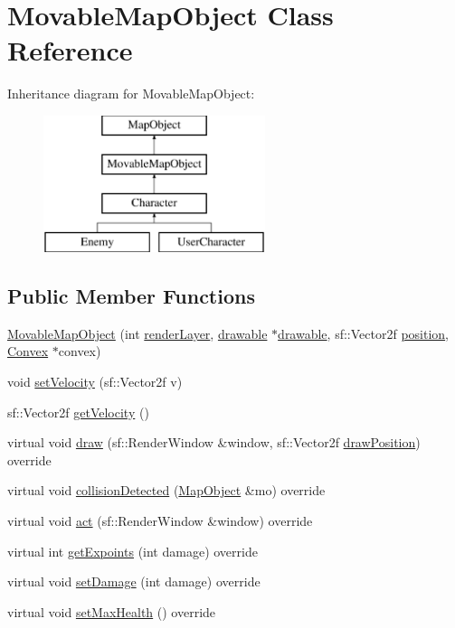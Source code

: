 \hypertarget{class_movable_map_object}{}\section{Movable\+Map\+Object Class Reference}
\label{class_movable_map_object}
Inheritance diagram for Movable\+Map\+Object\+:\begin{figure}[H]
\begin{center}
\leavevmode
\includegraphics[height=4.000000cm]{class_movable_map_object}
\end{center}
\end{figure}
\subsection*{Public Member Functions}
\begin{DoxyCompactItemize}
\item 
\hyperlink{class_movable_map_object_aa2969e8bb4201127cbd823f50969b25e}{Movable\+Map\+Object} (int \hyperlink{class_map_object_ac7431860a4ca955dc3db173926be3856}{render\+Layer}, \hyperlink{classdrawable}{drawable} $\ast$\hyperlink{classdrawable}{drawable}, sf\+::\+Vector2f \hyperlink{class_map_object_a00491cbf8e4cbc729ef37e11f3473860}{position}, \hyperlink{class_convex}{Convex} $\ast$convex)
\item 
void \hyperlink{class_movable_map_object_a7f65bdae85e8f0e86c1432c4dbe841a8}{set\+Velocity} (sf\+::\+Vector2f v)
\item 
sf\+::\+Vector2f \hyperlink{class_movable_map_object_a49a6370b16a5ba51b667d799f457f923}{get\+Velocity} ()
\item 
virtual void \hyperlink{class_movable_map_object_a37bfa95868c4c14a57a8f0b6c01baa50}{draw} (sf\+::\+Render\+Window \&window, sf\+::\+Vector2f \hyperlink{class_map_object_a3f383fa967b67989a1d30f8f9ff73936}{draw\+Position}) override
\item 
virtual void \hyperlink{class_movable_map_object_a741cf970a4938c9788a4847bd3efebf3}{collision\+Detected} (\hyperlink{class_map_object}{Map\+Object} \&mo) override
\item 
virtual void \hyperlink{class_movable_map_object_ac9b83a47e2711115e0c8a2b9e2e2180d}{act} (sf\+::\+Render\+Window \&window) override
\item 
virtual int \hyperlink{class_movable_map_object_aa03b3237424ff8af648e7ed3e12dfb59}{get\+Expoints} (int damage) override
\item 
virtual void \hyperlink{class_movable_map_object_a24bea2d5fcdea72edb4a262fe5cf5046}{set\+Damage} (int damage) override
\item 
virtual void \hyperlink{class_movable_map_object_ac767bcb318488552cc4e39088e677088}{set\+Max\+Health} () override
\end{DoxyCompactItemize}
